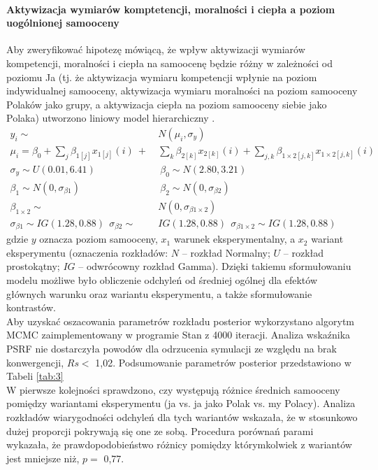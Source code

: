 \documentclass[man]{apa6}
\begin{document}
\paragraph{Aktywizacja wymiarów komptetencji, moralności i ciepła a poziom uogólnionej samooceny}
Aby zweryfikować hipotezę mówiącą, że wpływ aktywizacji wymiarów kompetencji, moralności i ciepła na samoocenę będzie różny w zależności od poziomu Ja (tj. że aktywizacja wymiaru kompetencji wpłynie na poziom indywidualnej samooceny, aktywizacja wymiaru moralności na poziom samooceny Polaków jako grupy, a aktywizacja ciepła na poziom samooceny siebie jako Polaka) utworzono liniowy model hierarchiczny \parencite[jako odpowiednik klasycznej dwuczynnikowej analizy wariancji, za:,][]{kruschke2014doing}.
\begin{equation}\label{eq:4}
\begin{split}
y_i  \sim\ & N(\mu_i, \sigma_y) \\
\mu_i  = \beta_0 + \sum_j\beta_{1[j]}x_{1[j]}(i)\ +\ &\sum_k\beta_{2[k]}x_{2[k]}(i)+\sum_{j,k}\beta_{1\times2[j,k]}x_{1\times2[j,k]}(i) \\
\sigma_y \sim U(0.01,6.41)\ &\ \beta_0 \sim N(2.80, 3.21) \\
\beta_1 \sim N(0, \sigma_{\beta1})\ &\ \beta_2 \sim N(0, \sigma_{\beta2}) \\
\beta_{1\times2} \sim\ & N(0, \sigma_{\beta1\times2}) \\
\sigma_{\beta1} \sim IG(1.28,0.88)\ \ \sigma_{\beta2} \sim\ & IG(1.28,0.88)\ \ \sigma_{\beta1\times2} \sim IG(1.28,0.88)
\end{split}
\end{equation}
gdzie $y$ oznacza poziom samooceny, $x_1$ warunek eksperymentalny, a $x_2$ wariant eksperymentu (oznaczenia rozkładów: $N$ -- rozkład Normalny; $U$ -- rozkład prostokątny; $IG$ -- odwrócowny rozkład Gamma). Dzięki takiemu sformułowaniu modelu możliwe było obliczenie odchyleń od średniej ogólnej dla efektów głównych warunku oraz wariantu eksperymentu, a także sformułowanie kontrastów. \\
Aby uzyskać oszacowania parametrów rozkładu posterior wykorzystano algorytm MCMC zaimplementowany w programie Stan \parencite{carpenter2016} z 4000 iteracji. Analiza wskaźnika PSRF nie dostarczyła powodów dla odrzucenia symulacji ze względu na brak konwergencji, $Rs <$ 1,02. Podsumowanie parametrów posterior przedstawiono w Tabeli \ref{tab:3} \\
W pierwsze kolejności sprawdzono, czy występują różnice średnich samooceny pomiędzy wariantami eksperymentu (ja vs. ja jako Polak vs. my Polacy). Analiza rozkładów wiarygodności odchyleń dla tych wariantów wskazała, że w stosunkowo dużej proporcji pokrywają się one ze sobą. Procedura porównań parami wykazała, że prawdopodobieństwo różnicy pomiędzy którymkolwiek z wariantów jest mniejsze niż, $p =$ 0,77. \\
\end{document}
